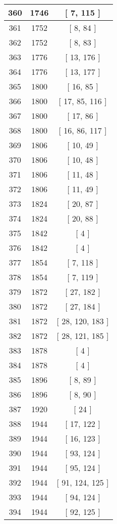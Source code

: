 \begin{center}
\begin{longtable}[H]{|| c c c ||}
\hline
360 & 1746 & [ 7, 115 ] \\ 
\hline
361 & 1752 & [ 8, 84 ] \\ 
\hline
362 & 1752 & [ 8, 83 ] \\ 
\hline
363 & 1776 & [ 13, 176 ] \\ 
\hline
364 & 1776 & [ 13, 177 ] \\ 
\hline
365 & 1800 & [ 16, 85 ] \\ 
\hline
366 & 1800 & [ 17, 85, 116 ] \\ 
\hline
367 & 1800 & [ 17, 86 ] \\ 
\hline
368 & 1800 & [ 16, 86, 117 ] \\ 
\hline
369 & 1806 & [ 10, 49 ] \\ 
\hline
370 & 1806 & [ 10, 48 ] \\ 
\hline
371 & 1806 & [ 11, 48 ] \\ 
\hline
372 & 1806 & [ 11, 49 ] \\ 
\hline
373 & 1824 & [ 20, 87 ] \\ 
\hline
374 & 1824 & [ 20, 88 ] \\ 
\hline
375 & 1842 & [ 4 ] \\ 
\hline
376 & 1842 & [ 4 ] \\ 
\hline
377 & 1854 & [ 7, 118 ] \\ 
\hline
378 & 1854 & [ 7, 119 ] \\ 
\hline
379 & 1872 & [ 27, 182 ] \\ 
\hline
380 & 1872 & [ 27, 184 ] \\ 
\hline
381 & 1872 & [ 28, 120, 183 ] \\ 
\hline
382 & 1872 & [ 28, 121, 185 ] \\ 
\hline
383 & 1878 & [ 4 ] \\ 
\hline
384 & 1878 & [ 4 ] \\ 
\hline
385 & 1896 & [ 8, 89 ] \\ 
\hline
386 & 1896 & [ 8, 90 ] \\ 
\hline
387 & 1920 & [ 24 ] \\ 
\hline
388 & 1944 & [ 17, 122 ] \\ 
\hline
389 & 1944 & [ 16, 123 ] \\ 
\hline
390 & 1944 & [ 93, 124 ] \\ 
\hline
391 & 1944 & [ 95, 124 ] \\ 
\hline
392 & 1944 & [ 91, 124, 125 ] \\ 
\hline
393 & 1944 & [ 94, 124 ] \\ 
\hline
394 & 1944 & [ 92, 125 ] \\ 

\end{longtable}
\end{center}
